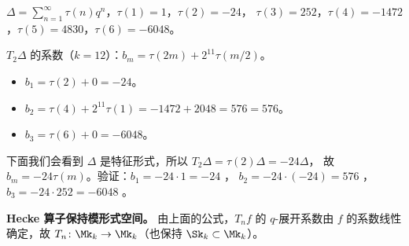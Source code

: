 \begin{example}
\label{ex:T2-Delta-explicit}
$\Delta = \sum_{n=1}^\infty \tau(n) q^n$，$\tau(1)=1$，$\tau(2)=-24$，
$\tau(3)=252$，$\tau(4)=-1472$，$\tau(5)=4830$，$\tau(6)=-6048$。

$T_2\Delta$ 的系数（$k=12$）：$b_m = \tau(2m) + 2^{11}\tau(m/2)$。
\begin{itemize}
  \item $b_1 = \tau(2) + 0 = -24$。
  \item $b_2 = \tau(4) + 2^{11}\tau(1) = -1472 + 2048 = 576 = 576$。
  \item $b_3 = \tau(6) + 0 = -6048$。
\end{itemize}
下面我们会看到 $\Delta$ 是特征形式，所以 $T_2\Delta = \tau(2)\Delta = -24\Delta$，
故 $b_m = -24\tau(m)$。验证：$b_1 = -24 \cdot 1 = -24$ \checkmark，
$b_2 = -24 \cdot (-24) = 576$ \checkmark，$b_3 = -24 \cdot 252 = -6048$ \checkmark。
\end{example}

\textbf{Hecke 算子保持模形式空间。}
由上面的公式，$T_n f$ 的 $q$-展开系数由 $f$ 的系数线性确定，故 $T_n\colon \Mk_k \to \Mk_k$（也保持 $\Sk_k \subset \Mk_k$）。


